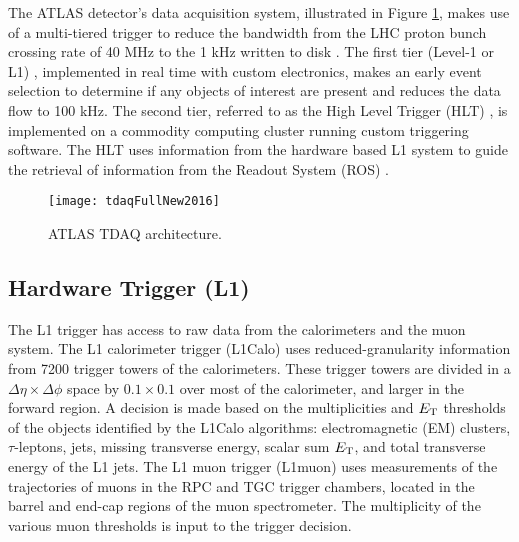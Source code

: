 The ATLAS  detector's data acquisition system, illustrated in Figure \ref{fig:tdaq_diagram}, makes use of a multi-tiered trigger to reduce the
bandwidth from the LHC proton bunch crossing rate of 40 MHz
to the 1 kHz written to disk \cite{evolution1,evolution2}. The first tier (Level-1 or L1) \cite{l1}, implemented in real time with custom electronics, 
makes an early event selection to determine if any objects of interest are present and reduces the data flow to 
100 kHz. The second tier, referred to as the High Level Trigger (HLT) \cite{hlt}, is implemented on a commodity computing cluster running custom triggering software. The HLT uses information from the
hardware based L1 system to guide the retrieval of information from the Readout System (ROS) \cite{ros}. 

\begin{figure}[!t]
\centering
\texttt{[image: tdaqFullNew2016]}
\vspace{-0.5cm}
\caption{ATLAS TDAQ architecture.}
\label{fig:tdaq_diagram}
\end{figure} 

\subsection{Hardware Trigger (L1)}
The L1 trigger has access to raw data from the calorimeters and the 
muon system. The L1 calorimeter trigger (L1Calo) uses reduced-granularity
information from 7200 trigger towers of the calorimeters. These trigger 
towers are divided in a $\Delta\eta\times\Delta\phi$ space by 
$0.1 \times 0.1$ over most of the calorimeter, and larger in the forward 
region. A decision is made based on the multiplicities and $E_{\rm{T}}$ 
thresholds of the objects 
identified by the L1Calo algorithms: electromagnetic (EM) clusters, 
$\tau$-leptons, jets, missing transverse energy, scalar sum $E_{\rm{T}}$, 
and total transverse energy of the L1 jets.
The L1 muon trigger (L1muon) uses measurements of the trajectories of muons 
in the RPC and TGC trigger chambers, located in the barrel and end-cap regions 
of the muon spectrometer. The multiplicity of the various muon \pt thresholds
is input to the trigger decision.


